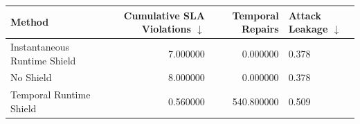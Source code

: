 \begin{tabular}{lrrl}
\toprule
Method & Cumulative SLA Violations $\downarrow$ & Temporal Repairs & Attack Leakage $\downarrow$ \\
\midrule
Instantaneous Runtime Shield & 7.000000 & 0.000000 & 0.378 \\
No Shield & 8.000000 & 0.000000 & 0.378 \\
Temporal Runtime Shield & 0.560000 & 540.800000 & 0.509 \\
\bottomrule
\end{tabular}
